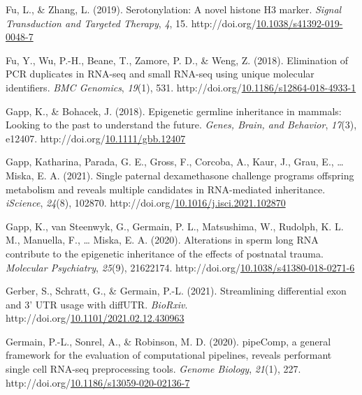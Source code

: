 \documentclass[12pt,twoside]{reedthesis}
\newlength{\cslhangindent}
\newenvironment{CSLReferences}[2] %
 {%
  \setlength{\parindent}{0pt}
  \ifodd #1 \everypar{\setlength{\hangindent}{\cslhangindent}}\ignorespaces\fi
  \ifnum #2 > 0
  \setlength{\parskip}{#2\baselineskip}
  \fi
 }%
 {}
\begin{document}
\begin{CSLReferences}{1}{0}
\leavevmode{}%
Fu, L., \& Zhang, L. (2019). Serotonylation: A novel histone H3 marker. \emph{Signal Transduction and Targeted Therapy}, \emph{4}, 15. http://doi.org/\href{https://doi.org/10.1038/s41392-019-0048-7}{10.1038/s41392-019-0048-7}

\leavevmode{}%
Fu, Y., Wu, P.-H., Beane, T., Zamore, P. D., \& Weng, Z. (2018). Elimination of PCR duplicates in RNA-seq and small RNA-seq using unique molecular identifiers. \emph{BMC Genomics}, \emph{19}(1), 531. http://doi.org/\href{https://doi.org/10.1186/s12864-018-4933-1}{10.1186/s12864-018-4933-1}

\leavevmode{}%
Gapp, K., \& Bohacek, J. (2018). Epigenetic germline inheritance in mammals: Looking to the past to understand the future. \emph{Genes, Brain, and Behavior}, \emph{17}(3), e12407. http://doi.org/\href{https://doi.org/10.1111/gbb.12407}{10.1111/gbb.12407}

\leavevmode{}%
Gapp, Katharina, Parada, G. E., Gross, F., Corcoba, A., Kaur, J., Grau, E., \ldots{} Miska, E. A. (2021). Single paternal dexamethasone challenge programs offspring metabolism and reveals multiple candidates in RNA-mediated inheritance. \emph{iScience}, \emph{24}(8), 102870. http://doi.org/\href{https://doi.org/10.1016/j.isci.2021.102870}{10.1016/j.isci.2021.102870}

\leavevmode{}%
Gapp, K., van Steenwyk, G., Germain, P. L., Matsushima, W., Rudolph, K. L. M., Manuella, F., \ldots{} Miska, E. A. (2020). Alterations in sperm long RNA contribute to the epigenetic inheritance of the effects of postnatal trauma. \emph{Molecular Psychiatry}, \emph{25}(9), 21622174. http://doi.org/\href{https://doi.org/10.1038/s41380-018-0271-6}{10.1038/s41380-018-0271-6}

\leavevmode{}%
Gerber, S., Schratt, G., \& Germain, P.-L. (2021). Streamlining differential exon and 3' UTR usage with diffUTR. \emph{BioRxiv}. http://doi.org/\href{https://doi.org/10.1101/2021.02.12.430963}{10.1101/2021.02.12.430963}

\leavevmode{}%
Germain, P.-L., Sonrel, A., \& Robinson, M. D. (2020). pipeComp, a general framework for the evaluation of computational pipelines, reveals performant single cell RNA-seq preprocessing tools. \emph{Genome Biology}, \emph{21}(1), 227. http://doi.org/\href{https://doi.org/10.1186/s13059-020-02136-7}{10.1186/s13059-020-02136-7}


\end{CSLReferences}
\end{document}
